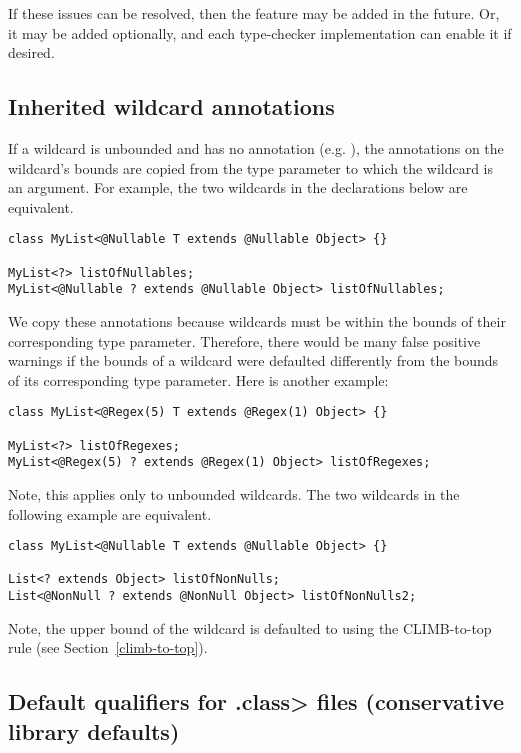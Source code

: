 If these issues can be resolved, then the feature may be added in the
future.  Or, it may be added optionally, and each type-checker
implementation can enable it if desired.


\subsection{Inherited wildcard annotations\label{inherited-wildcard-annotations}}

If a wildcard is unbounded and has no annotation (e.g. ),
the annotations on the wildcard's bounds are copied from the type parameter
to which the wildcard is an argument.  For example, the two wildcards in
the declarations below are equivalent.

\begin{Verbatim}
class MyList<@Nullable T extends @Nullable Object> {}

MyList<?> listOfNullables;
MyList<@Nullable ? extends @Nullable Object> listOfNullables;
\end{Verbatim}

We copy these annotations because wildcards must be within the bounds of their
corresponding type parameter.  Therefore, there would be many false positive
 warnings if the bounds of a wildcard
were defaulted differently from the bounds of its corresponding type parameter.
Here is another example:

\begin{Verbatim}
class MyList<@Regex(5) T extends @Regex(1) Object> {}

MyList<?> listOfRegexes;
MyList<@Regex(5) ? extends @Regex(1) Object> listOfRegexes;
\end{Verbatim}

Note, this applies only to unbounded wildcards.  The two wildcards in the
following example are equivalent.

\begin{Verbatim}
class MyList<@Nullable T extends @Nullable Object> {}

List<? extends Object> listOfNonNulls;
List<@NonNull ? extends @NonNull Object> listOfNonNulls2;
\end{Verbatim}

Note, the upper bound of the wildcard  is defaulted to
 using the CLIMB-to-top rule (see Section~\ref{climb-to-top}).

\subsection{Default qualifiers for \<.class> files (conservative library defaults)\label{defaults-classfile}}

